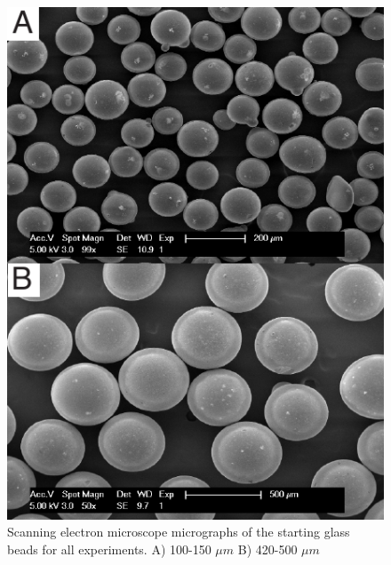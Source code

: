 \begin{figure}
\includegraphics[width=30pc]{chap_electrical/sem_initial.pdf}
\caption{Scanning electron microscope micrographs of the starting glass beads for all experiments.  A) 100-150 $\mu m$ B) 420-500 $\mu m$}
\label{starting_SEM}
\end{figure}

\clearpage

